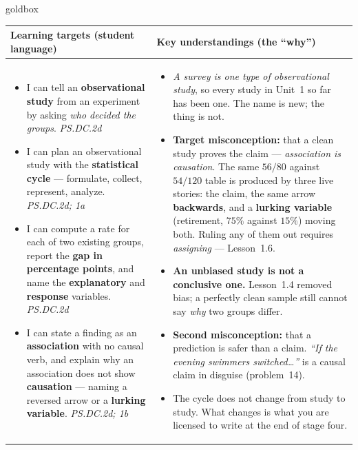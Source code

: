 \documentclass[10pt]{article}
\begin{document}
\renewcommand{\arraystretch}{1.4}
\boxguard
\begin{skillbox}{goldbox}
\begin{tabularx}{\linewidth}{@{}X|X@{}}
\textbf{Learning targets (student language)} & \textbf{Key understandings (the ``why'')} \\[2pt]
\hline
\vspace{-6pt}
\begin{itemize}[leftmargin=1.1em, nosep, after=\vspace{2pt}]
  \item I can tell an \textbf{observational study} from an experiment by asking \emph{who
        decided the groups}. \hfill \textit{PS.DC.2d}
  \item I can plan an observational study with the \textbf{statistical cycle} --- formulate,
        collect, represent, analyze. \hfill \textit{PS.DC.2d; 1a}
  \item I can compute a rate for each of two existing groups, report the \textbf{gap in
        percentage points}, and name the \textbf{explanatory} and \textbf{response}
        variables. \hfill \textit{PS.DC.2d}
  \item I can state a finding as an \textbf{association} with no causal verb, and explain why
        an association does not show \textbf{causation} --- naming a reversed arrow or a
        \textbf{lurking variable}. \hfill \textit{PS.DC.2d; 1b}
\end{itemize}
&
\vspace{-6pt}
\begin{itemize}[leftmargin=1.1em, nosep, after=\vspace{2pt}]
  \item \emph{A survey is one type of observational study}, so every study in Unit~1 so far
        has been one. The name is new; the thing is not.
  \item \textbf{Target misconception:} that a clean study proves the claim --- \emph{association
        is causation}. The same $56/80$ against $54/120$ table is produced by three live
        stories: the claim, the same arrow \textbf{backwards}, and a \textbf{lurking variable}
        (retirement, $75\%$ against $15\%$) moving both. Ruling any of them out requires
        \emph{assigning} --- Lesson~1.6.
  \item \textbf{An unbiased study is not a conclusive one.} Lesson~1.4 removed bias; a
        perfectly clean sample still cannot say \emph{why} two groups differ.
  \item \textbf{Second misconception:} that a prediction is safer than a claim. \emph{``If the
        evening swimmers switched\ldots''} is a causal claim in disguise (problem~14).
  \item The cycle does not change from study to study. What changes is what you are licensed
        to write at the end of stage four.
\end{itemize}
\end{tabularx}
\end{skillbox}
\end{document}
